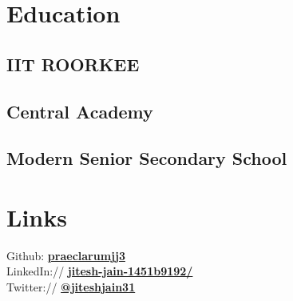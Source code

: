 \documentclass[letterpaper]{deedy-resume} %
\begin{document}
\begin{minipage}[t]{0.33\textwidth} %


\section{Education} 

\subsection{IIT ROORKEE}


\sectionspace %


\subsection{Central Academy}


\sectionspace %


\subsection{Modern Senior Secondary School}


\sectionspace %


\section{Links} 

Github: \href{https://github.com/praeclarumjj3}{\bf praeclarumjj3} \\
LinkedIn:// \href{https://www.linkedin.com/in/jitesh-jain-1451b9192/}{\bf jitesh-jain-1451b9192/} \\
Twitter:// \href{https://twitter.com/jiteshjain31}{\bf @jiteshjain31} \\


\end{minipage}
\end{document}
